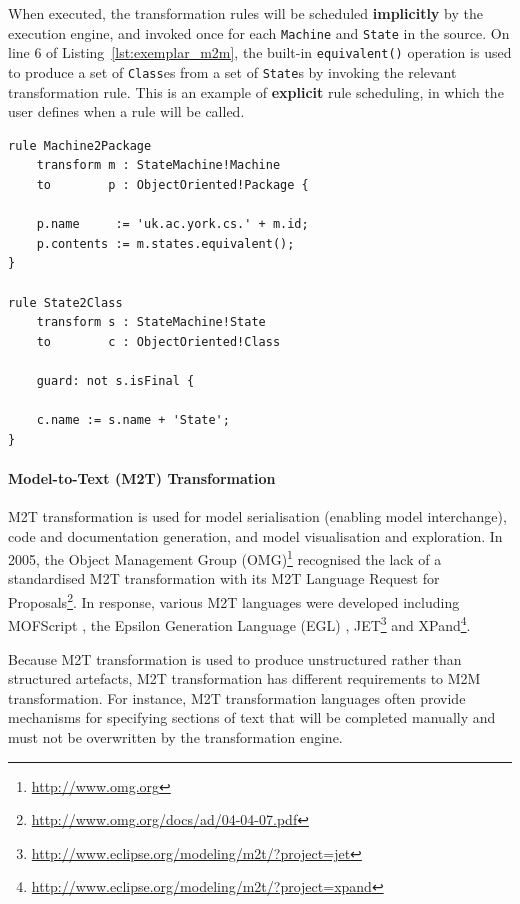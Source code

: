 When executed, the transformation rules will be scheduled \textbf{implicitly} by the execution engine, and invoked once for each \texttt{Machine} and \texttt{State} in the source. On line 6 of Listing~\ref{lst:exemplar_m2m}, the built-in \texttt{equivalent()} operation is used to produce a set of \texttt{Class}es from a set of \texttt{State}s by invoking the relevant transformation rule. This is an example of \textbf{explicit} rule scheduling, in which the user defines when a rule will be called.

\begin{lstlisting}[caption={[M2M transformation in ETL]M2M transformation in the Epsilon Transformation Language \cite{kolovos08etl}}, label=lst:exemplar_m2m, language=ETL]
rule Machine2Package
	transform m : StateMachine!Machine
	to        p : ObjectOriented!Package {
		
	p.name     := 'uk.ac.york.cs.' + m.id;
	p.contents := m.states.equivalent();
}

rule State2Class
	transform s : StateMachine!State
	to        c : ObjectOriented!Class 
	
	guard: not s.isFinal {
		
	c.name := s.name + 'State';
}
\end{lstlisting}


\paragraph{Model-to-Text (M2T) Transformation} M2T transformation is used for model serialisation (enabling model interchange), code and documentation generation, and model visualisation and exploration.  In 2005, the Object Management Group (OMG)\footnote{\url{http://www.omg.org}} recognised the lack of a standardised M2T transformation with its M2T Language Request for Proposals\footnote{\url{http://www.omg.org/docs/ad/04-04-07.pdf}}. In response, various M2T languages were developed including MOFScript \cite{oldevik05toward}, the Epsilon Generation Language (EGL) \cite{rose08egl}, JET\footnote{\url{http://www.eclipse.org/modeling/m2t/?project=jet}} and XPand\footnote{\url{http://www.eclipse.org/modeling/m2t/?project=xpand}}.

Because M2T transformation is used to produce unstructured rather than structured artefacts, M2T transformation has different requirements to M2M transformation. For instance, M2T transformation languages often provide mechanisms for specifying sections of text that will be completed manually and must not be overwritten by the transformation engine.

